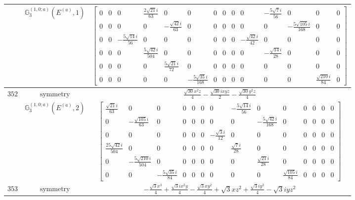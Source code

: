 \documentclass[fleqn,8pt,landscape]{jsarticle}
\begin{document}
\begin{longtable}{ccc}
$  $ & $ \mathbb{G}_{3}^{(1,0;a)}(E^{(a)},1) $ & $ \begin{bmatrix} 0 & 0 & 0 & \frac{2 \sqrt{21} i}{63} & 0 & 0 & 0 & 0 & 0 & 0 & - \frac{5 \sqrt{7} i}{56} & 0 & 0 & 0 \\ 0 & 0 & 0 & 0 & - \frac{\sqrt{42} i}{63} & 0 & 0 & 0 & 0 & 0 & 0 & - \frac{5 \sqrt{105} i}{168} & 0 & 0 \\ 0 & 0 & - \frac{5 \sqrt{14} i}{56} & 0 & 0 & 0 & 0 & 0 & 0 & - \frac{\sqrt{42} i}{42} & 0 & 0 & 0 & 0 \\ 0 & 0 & 0 & \frac{5 \sqrt{42} i}{504} & 0 & 0 & 0 & 0 & 0 & 0 & - \frac{\sqrt{14} i}{28} & 0 & 0 & 0 \\ 0 & 0 & 0 & 0 & \frac{5 \sqrt{21} i}{72} & 0 & 0 & 0 & 0 & 0 & 0 & 0 & 0 & 0 \\ 0 & 0 & 0 & 0 & 0 & - \frac{5 \sqrt{35} i}{168} & 0 & 0 & 0 & 0 & 0 & 0 & \frac{\sqrt{210} i}{84} & 0 \end{bmatrix} $ \\ \hline
$ 352 $ & $ \text{symmetry} $ & $ \frac{\sqrt{30} x^{2} z}{4} - \frac{\sqrt{30} i x y z}{2} - \frac{\sqrt{30} y^{2} z}{4} $ \\
$  $ & $ \mathbb{G}_{3}^{(1,0;a)}(E^{(a)},2) $ & $ \begin{bmatrix} \frac{\sqrt{21} i}{63} & 0 & 0 & 0 & 0 & 0 & 0 & - \frac{5 \sqrt{14} i}{56} & 0 & 0 & 0 & 0 & 0 & 0 \\ 0 & - \frac{\sqrt{105} i}{63} & 0 & 0 & 0 & 0 & 0 & 0 & - \frac{5 \sqrt{42} i}{168} & 0 & 0 & 0 & 0 & 0 \\ 0 & 0 & 0 & 0 & 0 & 0 & - \frac{\sqrt{3} i}{12} & 0 & 0 & 0 & 0 & 0 & 0 & 0 \\ \frac{25 \sqrt{42} i}{504} & 0 & 0 & 0 & 0 & 0 & 0 & \frac{\sqrt{7} i}{28} & 0 & 0 & 0 & 0 & 0 & 0 \\ 0 & - \frac{5 \sqrt{210} i}{504} & 0 & 0 & 0 & 0 & 0 & 0 & \frac{\sqrt{21} i}{28} & 0 & 0 & 0 & 0 & 0 \\ 0 & 0 & - \frac{5 \sqrt{35} i}{84} & 0 & 0 & 0 & 0 & 0 & 0 & \frac{\sqrt{105} i}{84} & 0 & 0 & 0 & 0 \end{bmatrix} $ \\ \hline
$ 353 $ & $ \text{symmetry} $ & $ - \frac{\sqrt{3} x^{3}}{4} + \frac{\sqrt{3} i x^{2} y}{4} - \frac{\sqrt{3} x y^{2}}{4} + \sqrt{3} x z^{2} + \frac{\sqrt{3} i y^{3}}{4} - \sqrt{3} i y z^{2} $ \\

\end{longtable}
\end{document}
